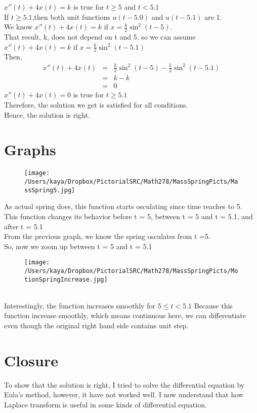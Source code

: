 \documentclass[12pt,letterpaper,fleqn]{article}
\begin{document}
$x''(t) + 4x(t) = k $ is true for $t \geq 5 $ and $t < 5.1$ \\
If $t \geq 5.1$,then both unit functions $u(t-5.0)$ and $u(t-5.1)$ are 1.\\
We know $x''(t) + 4x(t) = k $ if $x = \frac{k}{2}\sin^2(t-5)$.\\
That result, k, does not depend on t and 5, so we can assume $x''(t) + 4x(t) = k $ if $x = \frac{k}{2}\sin^2(t-5.1)$\\
Then,
\begin{eqnarray*}
x''(t) + 4x(t) &=& \frac{k}{2}\sin^2(t-5) - \frac{k}{2}\sin^2(t-5.1)\\
&=& k - k \\
&=& 0
\end{eqnarray*}
$x''(t) + 4x(t) = 0$ is true for $t \geq 5.1 $\\
Therefore, the solution we get is satisfied for all conditions.\\
Hence, the solution is right.
\section{Graphs}
\begin{figure}[h]
\begin{center}
\texttt{[image: /Users/kaya/Dropbox/PictorialSRC/Math278/MassSpringPicts/MassSpring5.jpg]}
\end{center}
\end{figure}
As actual spring does, this function starts osculating since time reaches to 5.\\
This function changes its behavior before t = 5, between t = 5 and t = 5.1, and after t = 5.1 \\
From the previous graph, we know the spring osculates from t =5.\\
So, now we zoom up between t = 5 and t = 5.1\\
\begin{figure}[htbp]
\begin{center}
\texttt{[image: /Users/kaya/Dropbox/PictorialSRC/Math278/MassSpringPicts/MotionSpringIncrease.jpg]}
\end{center}
\end{figure}\\
Interestingly, the function increases smoothly for $5 \leq t < 5.1$ 
Because this function increase smoothly, which means continuous here, we can differentiate even though the original right hand side contains unit step.
\section{Closure}
To show that the solution is right, I tried to solve the differential equation by Eula's method, however, it have not worked well.
I now understand that how Laplace transform is useful in some kinds of differential equation.
\end{document}
